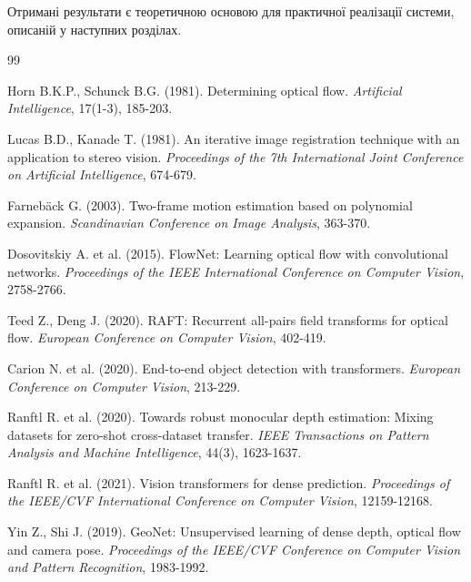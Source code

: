 \documentclass[14pt, a4paper]{extarticle}
\numberwithin{equation}{section}
\begin{document}
Отримані результати є теоретичною основою для практичної реалізації системи, описаній у наступних розділах.

\begin{thebibliography}{99}

Horn B.K.P., Schunck B.G. (1981). Determining optical flow. \textit{Artificial Intelligence}, 17(1-3), 185-203.

Lucas B.D., Kanade T. (1981). An iterative image registration technique with an application to stereo vision. \textit{Proceedings of the 7th International Joint Conference on Artificial Intelligence}, 674-679.

Farnebäck G. (2003). Two-frame motion estimation based on polynomial expansion. \textit{Scandinavian Conference on Image Analysis}, 363-370.

Dosovitskiy A. et al. (2015). FlowNet: Learning optical flow with convolutional networks. \textit{Proceedings of the IEEE International Conference on Computer Vision}, 2758-2766.

Teed Z., Deng J. (2020). RAFT: Recurrent all-pairs field transforms for optical flow. \textit{European Conference on Computer Vision}, 402-419.

Carion N. et al. (2020). End-to-end object detection with transformers. \textit{European Conference on Computer Vision}, 213-229.

Ranftl R. et al. (2020). Towards robust monocular depth estimation: Mixing datasets for zero-shot cross-dataset transfer. \textit{IEEE Transactions on Pattern Analysis and Machine Intelligence}, 44(3), 1623-1637.

Ranftl R. et al. (2021). Vision transformers for dense prediction. \textit{Proceedings of the IEEE/CVF International Conference on Computer Vision}, 12159-12168.

Yin Z., Shi J. (2019). GeoNet: Unsupervised learning of dense depth, optical flow and camera pose. \textit{Proceedings of the IEEE/CVF Conference on Computer Vision and Pattern Recognition}, 1983-1992.

\end{thebibliography}
\end{document}
